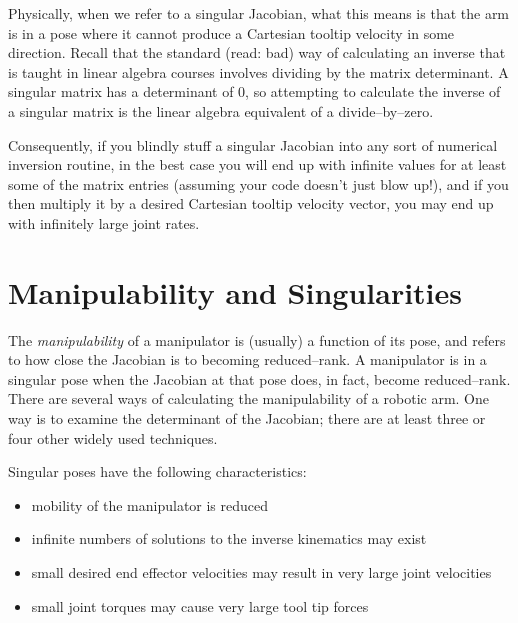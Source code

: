 \documentclass[]{article}
\begin{document}
Physically, when we refer to a singular Jacobian, what this means is that the arm is in a pose where it cannot produce a Cartesian tooltip velocity in some direction. Recall that the standard (read: bad) way of calculating an inverse that is taught in linear algebra courses involves dividing by the matrix determinant. A singular matrix has a determinant of 0, so attempting to calculate the inverse of a singular matrix is the linear algebra equivalent of a divide--by--zero.

Consequently, if you blindly stuff a singular Jacobian into any sort of numerical inversion routine, in the best case you will end up with infinite values for at least some of the matrix entries (assuming your code doesn't just blow up!), and if you then multiply it by a desired Cartesian tooltip velocity vector, you may end up with infinitely large joint rates.

\section{Manipulability and Singularities}
The \textit{manipulability} of a manipulator is (usually) a function of its pose, and refers to how close the Jacobian is to becoming reduced--rank. A manipulator is in a singular pose when the Jacobian at that pose does, in fact, become reduced--rank. There are several ways of calculating the manipulability of a robotic arm. One way is to examine the determinant of the Jacobian; there are at least three or four other widely used techniques.

Singular poses have the following characteristics:
\begin{itemize}
	\item mobility of the manipulator is reduced
	\item infinite numbers of solutions to the inverse kinematics may exist
	\item small desired end effector velocities may result in very large joint velocities
	\item small joint torques may cause very large tool tip forces
\end{itemize}
\end{document}
